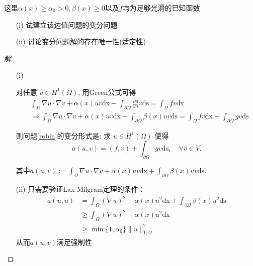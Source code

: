 \documentclass[12pt,a4paper]{article}
\begin{document}
\begin{enumerate}
		
		这里$\alpha(x)\geq\alpha_0>0,\beta(x)\geq0$以及$f$均为足够光滑的已知函数
		
		\begin{enumerate}
			\item[(i)]   试建立该边值问题的变分问题
			\item[(ii)]  讨论变分问题解的存在唯一性(适定性)
		\end{enumerate}
		\begin{proof}[解]\let\qed\relax
			\begin{enumerate}
				\item[(i)] 
				
				对任意 $v \in H^1(\Omega)$, 用Green公式可得
				$$
				\begin{aligned}
					& \int_{\Omega} \nabla u \cdot \nabla v + \alpha(x)uv \mathrm{dx}-\int_{\partial \Omega} \frac{\partial u}{\partial n} v \mathrm{ds}=\int_{\Omega} f v \mathrm{dx} \\
					& \Rightarrow  \int_{\Omega} \nabla u \cdot \nabla v + \alpha(x)uv \mathrm{dx}+\int_{\partial \Omega}\beta(x)uv \mathrm{ds}=\int_{\Omega} f v \mathrm{dx} + \int_{\partial \Omega} gv \mathrm{ds}
				\end{aligned}
				$$
				
				则问题\eqref{robin}的变分形式是: 求 $u \in H^1(\Omega)$ 使得
				\begin{equation}
					a(u, v)=(f, v)+\int_{\partial \Omega} gv \mathrm{ds}, \quad \forall v \in V.
					\label{weak}
				\end{equation}
				
				其中$a(u, v):= \int_{\Omega} \nabla u \cdot \nabla v + \alpha(x)uv \mathrm{dx}+\int_{\partial \Omega}\beta(x)uv \mathrm{ds}$.
				
				\item[(ii)] 只需要验证Lax-Milgram定理的条件：
				\begin{equation*}
					\begin{aligned}
						a(u,u) &= \int_{\Omega} (\nabla u)^2 + \alpha(x)u^2 \mathrm{dx}+\int_{\partial \Omega}\beta(x)u^2 \mathrm{ds}\\
						&\geqslant \int_{\Omega} (\nabla u)^2 + \alpha(x)u^2 \mathrm{dx}\\
						&\geqslant \min\{1,\alpha_0\} \|u\|_{1,\Omega}^2
					\end{aligned}
				\end{equation*}
				从而$a(u,v)$满足强制性
				

\end{enumerate}
\end{proof}
\end{enumerate}
\end{document}
